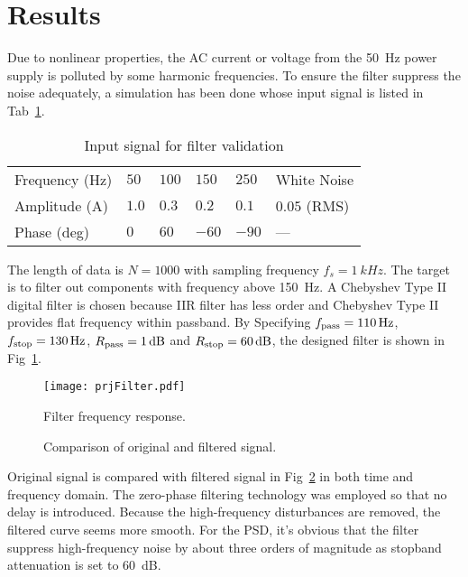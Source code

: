 \section{Results}


Due to nonlinear properties, the AC current or voltage from the \SI{50}{Hz} power supply is polluted by some harmonic frequencies. To ensure the filter suppress the noise adequately, a simulation has been done whose input signal is listed in Tab~\ref{tab:input}.


\begin{table}[!htb]
    \centering
    \caption{Input signal for filter validation}
    \label{tab:input}
    \begin{tabular}{llllll}
        \toprule
        Frequency (\si{Hz}) & $50$ & $100$ & $150$ & $250$ & White Noise \\
        Amplitude (\si{A}) & $1.0$ & $0.3$ & $0.2$ & $0.1$ & $0.05$ (RMS) \\
        Phase (\si{deg}) & $0$ & $60$ & $-60$ & $-90$ & --- \\
        \bottomrule
    \end{tabular}
\end{table}


The length of data is $N=1000$ with sampling frequency $f_s=\SI{1}{kHz}$. The target is to filter out components with frequency above \SI{150}{Hz}. A Chebyshev Type II digital filter is chosen because IIR filter has less order and Chebyshev Type II provides flat frequency within passband. By Specifying $f_{\rm pass} = \SI{110}{Hz}$, $f_{\rm stop} = \SI{130}{Hz}$, $R_{\rm pass} = \SI{1}{dB}$ and $R_{\rm stop} = \SI{60}{dB}$, the designed filter is shown in Fig~\ref{fig:prjFilter}.


\begin{figure}[!htb]
    \centering
    \texttt{[image: prjFilter.pdf]}
    \caption{Filter frequency response.}
    \label{fig:prjFilter}
\end{figure}


\begin{figure}[!htb]
    \centering
    \hfill
    \caption{Comparison of original and filtered signal.}
    \label{fig:prjSignals}
\end{figure}


Original signal is compared with filtered signal in Fig~\ref{fig:prjSignals} in both time and frequency domain. The zero-phase filtering technology was employed so that no delay is introduced. Because the high-frequency disturbances are removed, the filtered curve seems more smooth. For the PSD, it's obvious that the filter suppress high-frequency noise by about three orders of magnitude as stopband attenuation is set to \SI{60}{dB}.




